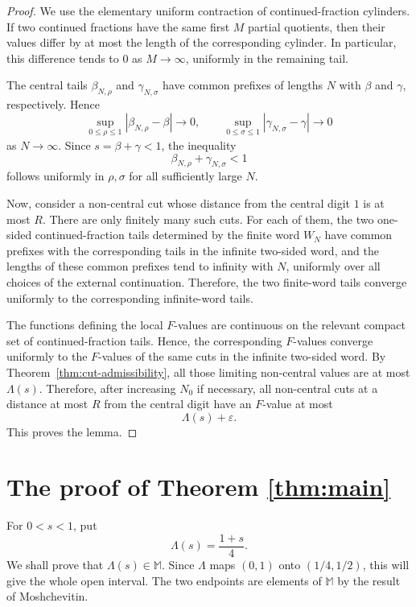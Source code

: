 \documentclass[11pt]{amsart}
\newcommand{\MS}{\mathbb M}
\begin{document}
\begin{proof}
We use the elementary uniform contraction of continued-fraction cylinders. If two continued fractions have the same first $M$ partial quotients, then their values differ by at most the length of the corresponding cylinder. In particular, this difference tends to $0$ as $M\to\infty$, uniformly in the remaining tail.

The central tails $\beta_{N,\rho}$ and $\gamma_{N,\sigma}$ have common prefixes of lengths $N$ with $\beta$ and $\gamma$, respectively. Hence
$$
        \sup_{0\le \rho\le 1}|\beta_{N,\rho}-\beta|\to 0,
        \qquad
        \sup_{0\le \sigma\le 1}|\gamma_{N,\sigma}-\gamma|\to 0
$$
as $N\to\infty$. Since $s=\beta+\gamma<1$, the inequality
$$
        \beta_{N,\rho}+\gamma_{N,\sigma}<1
$$
follows uniformly in $\rho,\sigma$ for all sufficiently large $N$.

Now, consider a non-central cut whose distance from the central digit $1$ is at most $R$. There are only finitely many such cuts. For each of them, the two one-sided continued-fraction tails determined by the finite word $W_N$ have common prefixes with the corresponding tails in the infinite two-sided word, and the lengths of these common prefixes tend to infinity with $N$, uniformly over all choices of the external continuation. Therefore, the two finite-word tails converge uniformly to the corresponding infinite-word tails.

The functions defining the local $F$-values are continuous on the relevant compact set of continued-fraction tails. Hence, the corresponding $F$-values converge uniformly to the $F$-values of the same cuts in the infinite two-sided word. By Theorem~\ref{thm:cut-admissibility}, all those limiting non-central values are at most $\Lambda(s)$. Therefore, after increasing $N_0$ if necessary, all non-central cuts at a distance at most $R$ from the central digit have an $F$-value at most
$$
        \Lambda(s)+\varepsilon.
$$
This proves the lemma.
\end{proof}



\section{The proof of Theorem \ref{thm:main}}\label{sec:proof:main}

For $0<s<1$, put
$$
        \Lambda(s)=\frac{1+s}{4}.
$$
We shall prove that $\Lambda(s)\in\MS$.  Since $\Lambda$ maps $(0,1)$ onto $(1/4,1/2)$, this will give the whole open interval.  The two endpoints are elements of $\MS$ by the result of Moshchevitin.
\end{document}
